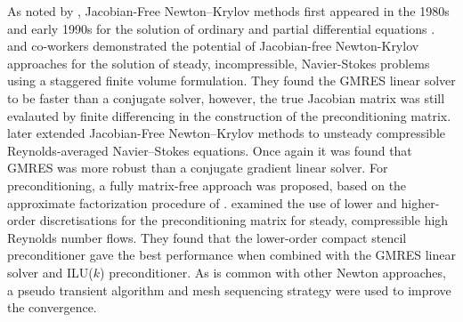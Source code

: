 \documentclass[sn-mathphys,Numbered]{sn-jnl}%
\begin{document}
As noted by \citet{Knoll2004}, Jacobian-Free Newton–Krylov methods first appeared in the 1980s and early 1990s for the solution of ordinary and partial differential equations \citep{Gear1983, Chan1984, Brown1986, Brown1990}.
\citet{Mchugh1994} and co-workers demonstrated the potential of Jacobian-free Newton-Krylov approaches for the solution of steady, incompressible, Navier-Stokes problems using a staggered finite volume formulation.
They found the GMRES linear solver to be faster than a conjugate solver, however, the true Jacobian matrix was still evalauted by finite differencing in the construction of the preconditioning matrix.
\citet{Qin2000} later extended Jacobian-Free Newton–Krylov methods to unsteady compressible Reynolds-averaged Navier–Stokes equations.
Once again it was found that GMRES was more robust than a conjugate gradient linear solver.
For preconditioning, a fully matrix-free approach was proposed, based on the approximate factorization procedure of \citet{Badcock1996}.
\citet{Geuzaine2001} examined the use of lower and higher-order discretisations for the preconditioning matrix for steady, compressible high Reynolds number flows.
They found that the lower-order compact stencil preconditioner gave the best performance when combined with the GMRES linear solver and ILU($k$) preconditioner.
As is common with other Newton approaches, a pseudo transient algorithm and mesh sequencing strategy were used to improve the convergence.
\end{document}
